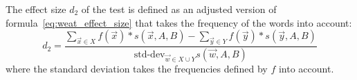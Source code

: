 The effect size $d_2$ of the test is defined as an adjusted version of
formula~\eqref{eq:weat_effect_size} that takes the frequency of the words into account:
\begin{equation}\label{eq:frequency_effect_size}
d_2\! =\! \frac{
    \displaystyle\sum_{\vec{x} \in X}\! f(\vec{x})\! *\! s(\vec{x}, A, B)\! -\! \sum_{\vec{y} \in Y}\! f(\vec{y}) * s(\vec{y}, A, B)
}{
\text{std-dev}_{\vec{w} \in X \cup Y} s(\vec{w},A,B)
}
\end{equation}
where the standard deviation takes the frequencies defined by $f$ into account.


